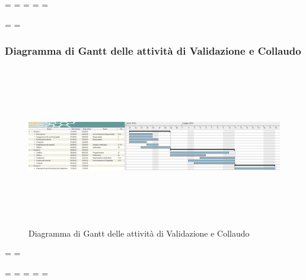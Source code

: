 \newpage
\paperwidth=\pdfpageheight
\paperheight=\pdfpagewidth
\pdfpageheight=\paperheight
\pdfpagewidth=\paperwidth
\headwidth=\textheight

\begingroup 
\vsize=\textwidth
\hsize=\textheight

\subsubsection{Diagramma di Gantt delle attività di Validazione e Collaudo}
\pagestyle{empty}
\begin{figure}[h]
	\centering
	\includegraphics[height = 7cm, width = 24.5cm]{Sezioni/DiagrammiGantt/Validazione.png}
	\caption{Diagramma di Gantt delle attività di Validazione e Collaudo}
\end{figure}

\textwidth=\hsize
\textheight=\vsize

\endgroup
\newpage
\paperwidth=\pdfpageheight
\paperheight=\pdfpagewidth
\pdfpageheight=\paperheight
\pdfpagewidth=\paperwidth
\headwidth=\textwidth